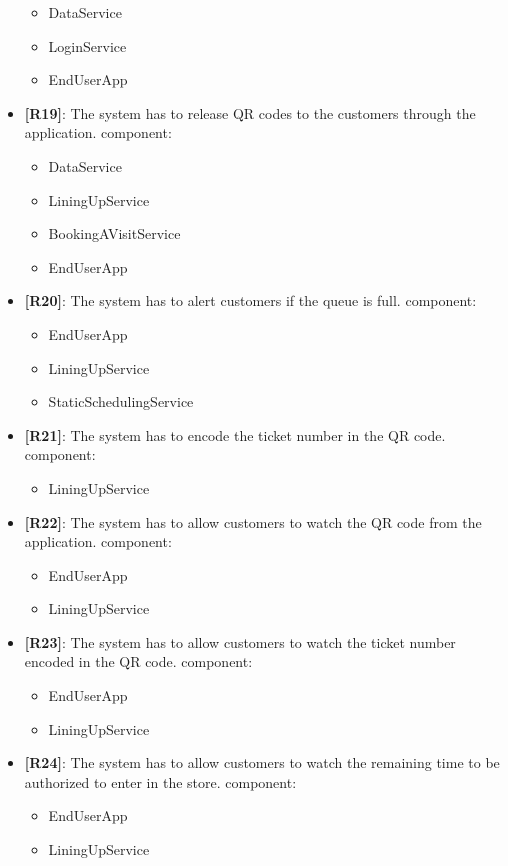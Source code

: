 \begin{itemize}
\begin{itemize}
	\item DataService 
	\item LoginService 
	\item EndUserApp  
	\end{itemize}
	\item {\textbf{[R19]}}: The system has to release QR codes to the customers through the application.
component:
	\begin{itemize}
	\item DataService 
	\item LiningUpService 
	\item BookingAVisitService 
	\item EndUserApp
	\end{itemize}
	\item {\textbf{[R20]}}: The system has to alert customers if the queue is full.
component:
	\begin{itemize}
	\item EndUserApp 
	\item LiningUpService 
	\item StaticSchedulingService
	\end{itemize}
	\item {\textbf{[R21]}}: The system has to encode the ticket number in the QR code.
component:
	\begin{itemize}
	\item LiningUpService
	\end{itemize}
	\item {\textbf{[R22]}}: The system has to allow customers to watch the QR code from the application.
component:
	\begin{itemize}
	\item EndUserApp 
	\item LiningUpService
	\end{itemize}
	\item {\textbf{[R23]}}: The system has to allow customers to watch the ticket number encoded in the QR code.
component:
	\begin{itemize}
	\item EndUserApp 
	\item LiningUpService
	\end{itemize}
	\item {\textbf{[R24]}}: The system has to allow customers to watch the remaining time to be authorized to enter in the store.
component:
	\begin{itemize}
	\item EndUserApp 
	\item LiningUpService

\end{itemize}
\end{itemize}
